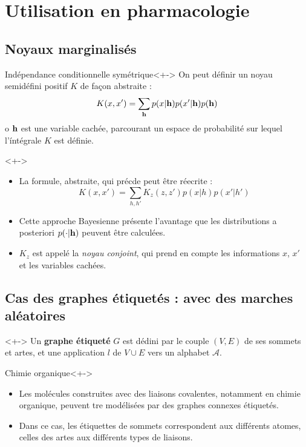 \section{Utilisation en pharmacologie}

\subsection{Noyaux marginalis\'es}

\begin{frame}
\begin{block}{Ind\'ependance conditionnelle sym\'etrique}<+->
On peut d\'efinir un noyau semid\'efini positif $K$ de fa\c con abstraite :
\[K(x,x')=\sum\limits_{\mathbf{h}}p(x|\mathbf{h})p(x'|\mathbf{h})p(\mathbf{h})\]
o $\mathbf{h}$ est une variable cach\'ee, parcourant un espace de probabilit\'e sur lequel l'\'int\'egrale $K$ est d\'efinie.
\end{block}
\begin{definition}<+->
\begin{itemize}
\item<+-> La formule, abstraite, qui pr\'ecde peut \^etre r\'eecrite : %
\[K(x,x')=\sum\limits_{h,h'}K_z(z,z')p(x|h)p(x'|h')\]
\item<+-> Cette approche Bayesienne pr\'esente l'avantage que les distributions a posteriori $p(\cdot|\mathbf{h})$ peuvent \^etre calcul\'ees.
\item<+-> $K_z$ est appel\'e la \emph{noyau conjoint}, qui prend en compte les informations $x$, $x'$ et les variables cach\'ees.
\end{itemize}
\end{definition}
\end{frame}

\subsection{Cas des graphes \'etiquet\'es : avec des marches al\'eatoires}

\begin{frame}
\begin{definition}<+->
Un \textbf{graphe \'etiquet\'e} $G$ est d\'edini par le couple $(V,E)$ de ses sommets et artes, et une application $l$ de $V\cup E$ vers un alphabet $\mathcal{A}$.
\end{definition}
\begin{block}{Chimie organique}<+->
\begin{itemize}
\item<+-> Les mol\'ecules construites avec des liaisons covalentes, notamment en chimie organique, peuvent tre mod\'elis\'ees par des graphes connexes \'etiquet\'es.
\item<+-> Dans ce cas, les \'etiquettes de sommets correspondent aux diff\'erents atomes, celles des artes aux diff\'erents types de liaisons.
\end{itemize}
\end{block}
\end{frame}

